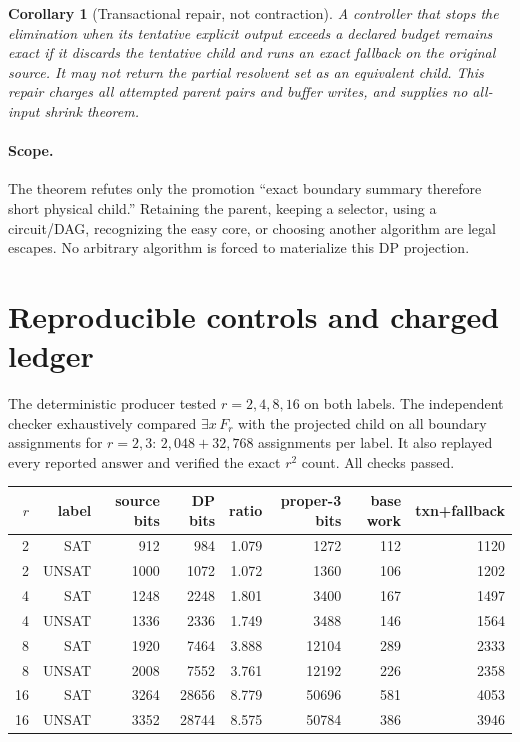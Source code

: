 \documentclass[11pt]{article}
\newtheorem{corollary}{Corollary}
\begin{document}
\begin{corollary}[Transactional repair, not contraction]
A controller that stops the elimination when its tentative explicit output
exceeds a declared budget remains exact if it discards the tentative child and
runs an exact fallback on the original source.  It may not return the partial
resolvent set as an equivalent child.  This repair charges all attempted
parent pairs and buffer writes, and supplies no all-input shrink theorem.
\end{corollary}

\paragraph{Scope.}
The theorem refutes only the promotion ``exact boundary summary therefore
short physical child.''  Retaining the parent, keeping a selector, using a
circuit/DAG, recognizing the easy core, or choosing another algorithm are
legal escapes.  No arbitrary algorithm is forced to materialize this DP
projection.

\section{Reproducible controls and charged ledger}
The deterministic producer tested $r=2,4,8,16$ on both labels.  The independent
checker exhaustively compared
\(\exists x\,F_r\) with the projected child on all boundary assignments for
$r=2,3$: $2{,}048+32{,}768$ assignments per label.  It also replayed every
reported answer and verified the exact $r^2$ count.  All checks passed.

\begin{center}\small
\begin{tabular}{rrrrrrrr}
\toprule
$r$&label&source bits&DP bits&ratio&proper-3 bits&base work&txn+fallback\\
\midrule
2&SAT&912&984&1.079&1272&112&1120\\
2&UNSAT&1000&1072&1.072&1360&106&1202\\
4&SAT&1248&2248&1.801&3400&167&1497\\
4&UNSAT&1336&2336&1.749&3488&146&1564\\
8&SAT&1920&7464&3.888&12104&289&2333\\
8&UNSAT&2008&7552&3.761&12192&226&2358\\
16&SAT&3264&28656&8.779&50696&581&4053\\
16&UNSAT&3352&28744&8.575&50784&386&3946\\
\bottomrule
\end{tabular}
\end{center}
\end{document}
